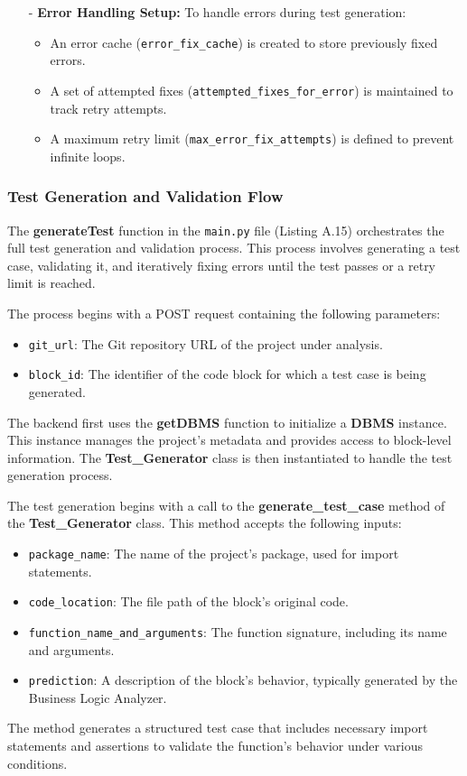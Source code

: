 \begin{itemize}
    \item[-] \textbf{Error Handling Setup:} To handle errors during test generation:
    \begin{itemize}
        \item An error cache (\texttt{error\_fix\_cache}) is created to store previously fixed errors.
        \item A set of attempted fixes (\texttt{attempted\_fixes\_for\_error}) is maintained to track retry attempts.
        \item A maximum retry limit (\texttt{max\_error\_fix\_attempts}) is defined to prevent infinite loops.
    \end{itemize}
\end{itemize}

\subsubsection{Test Generation and Validation Flow}

The \textbf{generateTest} function in the \texttt{main.py} file (Listing A.15) orchestrates the full test generation and validation process. This process involves generating a test case, validating it, and iteratively fixing errors until the test passes or a retry limit is reached.

The process begins with a POST request containing the following parameters:
\begin{itemize}
    \item \texttt{git\_url}: The Git repository URL of the project under analysis.
    \item \texttt{block\_id}: The identifier of the code block for which a test case is being generated.
\end{itemize}

The backend first uses the \textbf{getDBMS} function to initialize a \textbf{DBMS} instance. This instance manages the project's metadata and provides access to block-level information. The \textbf{Test\_Generator} class is then instantiated to handle the test generation process.

The test generation begins with a call to the \textbf{generate\_test\_case} method of the \textbf{Test\_Generator} class. This method accepts the following inputs:
\begin{itemize}
    \item \texttt{package\_name}: The name of the project's package, used for import statements.
    \item \texttt{code\_location}: The file path of the block's original code.
    \item \texttt{function\_name\_and\_arguments}: The function signature, including its name and arguments.
    \item \texttt{prediction}: A description of the block's behavior, typically generated by the Business Logic Analyzer.
\end{itemize}
The method generates a structured test case that includes necessary import statements and assertions to validate the function's behavior under various conditions.

